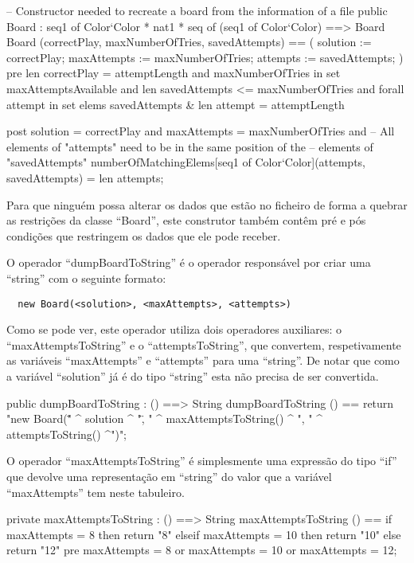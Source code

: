 \begin{vdm_al}
  -- Constructor needed to recreate a board from the information of a file
  public Board : seq1 of Color`Color * nat1 * seq of (seq1 of Color`Color) ==> Board
  Board (correctPlay, maxNumberOfTries, savedAttempts) == (
    solution := correctPlay;
    maxAttempts := maxNumberOfTries;
    attempts := savedAttempts;
  )
  pre len correctPlay = attemptLength and
    maxNumberOfTries in set maxAttemptsAvailable and
    len savedAttempts <= maxNumberOfTries and
    forall attempt in set elems savedAttempts & len attempt = attemptLength

  post solution = correctPlay and
    maxAttempts = maxNumberOfTries and
    -- All elements of "attempts" need to be in the same position of the
    -- elements of "savedAttempts"
    numberOfMatchingElems[seq1 of Color`Color](attempts, savedAttempts) = len attempts;
\end{vdm_al}

Para que ninguém possa alterar os dados que estão no ficheiro de forma
a quebrar as restrições da classe ``Board'', este construtor também
contêm pré e pós condições que restringem os dados que ele pode receber.

O operador ``dumpBoardToString'' é o operador responsável por criar
uma ``string'' com o seguinte formato:

\begin{verbatim}
  new Board(<solution>, <maxAttempts>, <attempts>)
\end{verbatim}

Como se pode ver, este operador utiliza dois operadores auxiliares: o
``maxAttemptsToString'' e o ``attemptsToString'', que convertem,
respetivamente as variáveis ``maxAttempts'' e ``attempts'' para uma
``string''. De notar que como a variável ``solution'' já é do tipo
``string'' esta não precisa de ser convertida.

\begin{vdm_al}
  public dumpBoardToString : () ==> String
  dumpBoardToString () ==
    return "new Board(\"" ^ solution ^ "\", " ^ maxAttemptsToString()
      ^ ", " ^ attemptsToString() ^")";
\end{vdm_al}

O operador ``maxAttemptsToString'' é simplesmente uma expressão do
tipo ``if'' que devolve uma representação em ``string'' do valor que a
variável ``maxAttempts'' tem neste tabuleiro.


\begin{vdm_al}
  private maxAttemptsToString : () ==> String
  maxAttemptsToString () ==
    if maxAttempts = 8 then return "8"
    elseif maxAttempts = 10 then return "10"
    else return "12"
  pre maxAttempts = 8 or maxAttempts = 10 or maxAttempts = 12;
\end{vdm_al}

